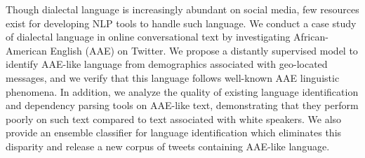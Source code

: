 Though dialectal language is increasingly abundant on social media, few resources exist for developing NLP tools to handle such language. We conduct a case study of dialectal language in online conversational text by investigating African-American English (AAE) on Twitter. We propose a distantly supervised model to identify AAE-like language from demographics associated with geo-located messages, and we verify that this language follows well-known AAE linguistic phenomena. In addition, we analyze the quality of existing language identification and dependency parsing tools on AAE-like text, demonstrating that they perform poorly on such text compared to text associated with white speakers. We also provide an ensemble classifier for language identification which eliminates this disparity and release a new corpus of tweets containing AAE-like language.

